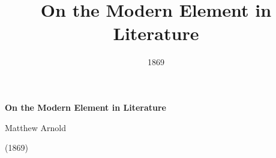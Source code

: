 \title{On the Modern Element in Literature}
\author{}
\date{1869}


\renewcommand{\chaptername}{Arnold, On the Modern Element in Literature}

\thispagestyle{plain}


\begin{raggedright}
{\Large \linespread{1.0} \noindent \textbf{On the Modern Element in Literature} \par} 

{\large Matthew Arnold \par} 

\vspace{0.5em}
\end{raggedright}

\begin{raggedleft}
{\large \linespread{1.2} (1869) \par}
\end{raggedleft}
\vspace{1em}








